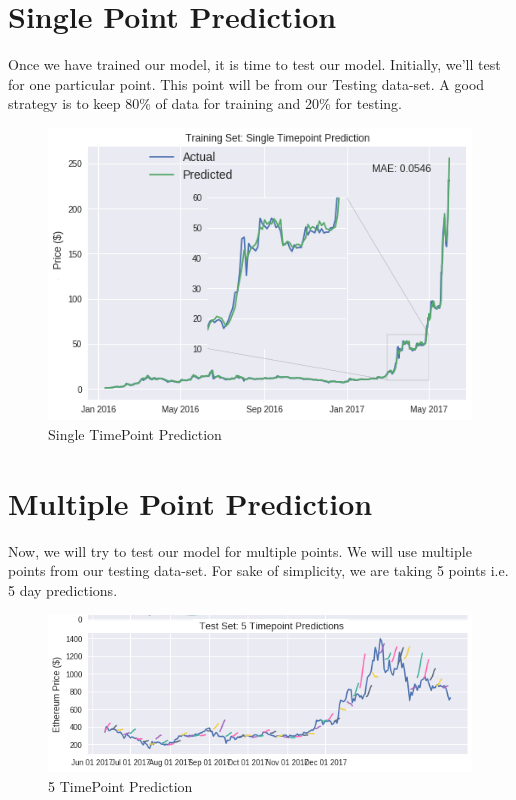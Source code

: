 \section{Single Point Prediction}
Once we have trained our model, it is time to test our model. Initially, we'll test for one particular point. This point will be from our Testing data-set. A good strategy is to keep 80\% of data for training and 20\% for testing.
\newpage
\begin{figure}[h]
    \centering \includegraphics[scale=0.7]{images/s-p.png}
    \caption{Single TimePoint Prediction}
\end{figure}

\section{Multiple Point Prediction}
Now, we will try to test our model for multiple points. We will use multiple points from our testing data-set. For sake of simplicity, we are taking 5 points i.e. 5 day predictions.

\begin{figure}[h]
    \centering \includegraphics[scale=0.7]{images/multi.png}
    \caption{5 TimePoint Prediction}
\end{figure}

